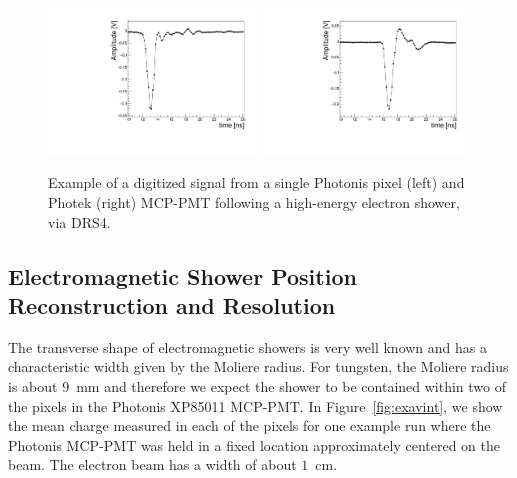 \begin{figure}[htbp]
  \centering
  \includegraphics[width=0.49\textwidth]{Images/expulse/pulsepix_30_2_12.pdf}
  \includegraphics[width=0.49\textwidth]{Images/expulse/pulseref_30_2_10.pdf}
  \caption{\small Example of a digitized signal from a single Photonis pixel
(left) and Photek (right) MCP-PMT following a high-energy electron shower, via DRS4.}
  \label{fig:expulse}
\end{figure}


\subsection{ Electromagnetic Shower Position Reconstruction and Resolution}\label{sec:position}
The transverse shape of electromagnetic showers is very
well known and has a characteristic width given by the Moliere radius. For
tungsten, the Moliere radius is about $9$~mm and therefore we expect the shower
to be contained within two of the pixels in the Photonis XP85011 MCP-PMT. In
Figure~\ref{fig:exavint}, we show the mean charge measured in each of the pixels
for one example run where the Photonis MCP-PMT was held in a fixed location
approximately centered on the beam. The electron beam has a width of about
$1$~cm. 

